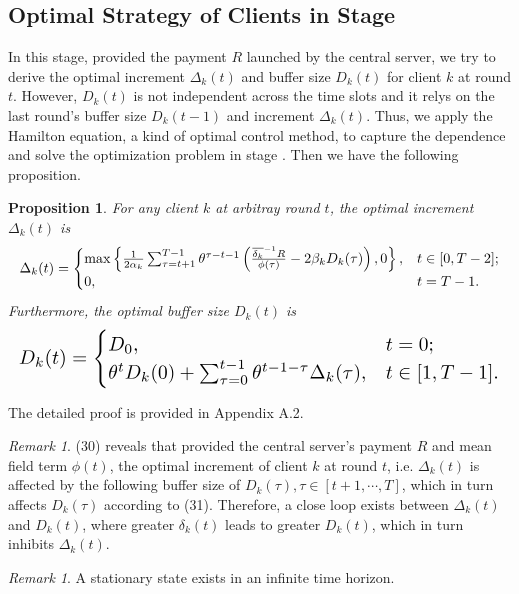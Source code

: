 \documentclass{article}
\theoremstyle{plain}
\newtheorem{proposition}[theorem]{Proposition}
\theoremstyle{definition}
\theoremstyle{remark}
\newtheorem{remark}[theorem]{Remark}
\begin{document}
\subsection{Optimal Strategy of Clients in Stage \uppercase\expandafter{}}
In this stage, provided the payment $R$ launched by the central server, we try to derive the optimal increment $\Delta_k(t)$ and buffer size $D_k(t)$ for client $k$ at round $t$.
However, $D_k(t)$ is not independent across the time slots and it relys on the last round's buffer size $D_k(t-1)$ and increment $\Delta_k(t)$. 
Thus, we apply the Hamilton equation, a kind of optimal control method, to capture the dependence and solve the optimization problem in stage \uppercase\expandafter{}. Then we have the following proposition.
\begin{proposition}
  For any client $k$ at arbitray round $t$, the optimal increment $\Delta_k(t)$ is
  \begin{equation}
    \resizebox{\columnwidth}{!}{$
      \Delta_k(t) = 
      \begin{cases}
        \max\left\{\frac{1}{2 \alpha_k} \sum_{\tau = t + 1}^{T - 1} \theta^{\tau - t - 1} \left(\frac{\overline{\delta_k}^{-1}R}{\phi(\tau)} - 2\beta_k D_k(\tau)\right), 0\right\}, & t \in [0, T-2]; \\
        \displaystyle 0, & t = T-1.
      \end{cases}    
    $}
  \label{proposition:delta}
  \end{equation}
  Furthermore, the optimal buffer size $D_k(t)$ is
  \begin{equation}
    \resizebox{\columnwidth}{!}{$
      D_k(t) = 
      \begin{cases}
        \displaystyle D_0, & t = 0; \\
        \theta^{t} D_k(0) + \sum_{\tau = 0}^{t-1} \theta^{t-1-\tau} \Delta_k(\tau), & t \in [1, T-1].
      \end{cases}
    $}
  \label{proposition:datasize}
  \end{equation}
\end{proposition}
The detailed proof is provided in Appendix A.2.
\begin{remark}
  (30) reveals that provided the central server's payment $R$ and mean field term $\phi(t)$, the optimal increment of client $k$ at round $t$, i.e. $\Delta_k(t)$ is affected by the following buffer size of $D_k(\tau), \tau \in [t+1, \cdots, T]$, which in turn affects $D_k(\tau)$ according to (31).
  Therefore, a close loop exists between $\Delta_k(t)$ and $D_k(t)$, where greater $\delta_k(t)$ leads to greater $D_k(t)$, which in turn inhibits $\Delta_k(t)$.
\end{remark}
\begin{remark}
  A stationary state exists in an infinite time horizon.
  \label{remark:stationary state}
\end{remark}
\end{document}
